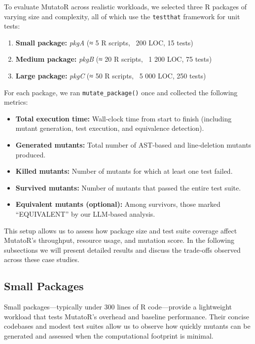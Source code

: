 To evaluate MutatoR across realistic workloads, we selected three R packages of varying size and complexity, all of which use the \texttt{testthat} framework for unit tests:

\begin{enumerate}
  \item \textbf{Small package:} \emph{pkgA} (≈ 5 R scripts, ~200 LOC, 15 tests)  
  \item \textbf{Medium package:} \emph{pkgB} (≈ 20 R scripts, ~1 200 LOC, 75 tests)  
  \item \textbf{Large package:} \emph{pkgC} (≈ 50 R scripts, ~5 000 LOC, 250 tests)  
\end{enumerate}

For each package, we ran \texttt{mutate\_package()} once and collected the following metrics:

\begin{itemize}
  \item \textbf{Total execution time:} Wall‐clock time from start to finish (including mutant generation, test execution, and equivalence detection).  
  \item \textbf{Generated mutants:} Total number of AST‐based and line‐deletion mutants produced.  
  \item \textbf{Killed mutants:} Number of mutants for which at least one test failed.  
  \item \textbf{Survived mutants:} Number of mutants that passed the entire test suite.  
  \item \textbf{Equivalent mutants (optional):} Among survivors, those marked “EQUIVALENT” by our LLM‐based analysis.
\end{itemize}

This setup allows us to assess how package size and test suite coverage affect MutatoR’s throughput, resource usage, and mutation score.  In the following subsections we will present detailed results and discuss the trade‐offs observed across these case studies.

\subsection{Small Packages}

Small packages—typically under 300 lines of R code—provide a lightweight workload that tests MutatoR’s overhead and baseline performance. Their concise codebases and modest test suites allow us to observe how quickly mutants can be generated and assessed when the computational footprint is minimal.

